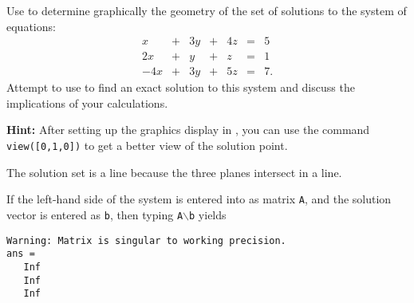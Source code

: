 \documentclass{ximera}
\begin{document}
\begin{computerExercise} \label{c2.2.4}
Use \Matlab to determine graphically the geometry of the set of
solutions to the system of equations:
\[
\begin{array}{rcrcrcr}
  x & + & 3y & + & 4z  & = & 5\\
 2x & + &  y & + &  z  & = & 1\\
-4x & + & 3y & + & 5z  & = & 7.
\end{array}
\]
Attempt to use \Matlab to find an exact solution to this system
and discuss the implications of your calculations.

{\bf Hint:} After setting up the graphics display in \Matlabp,
you can use the command {\tt view([0,1,0])}  to get
a better view of the solution point.

\begin{solution}

\ans The solution set is a line because the three planes intersect in a line.

\soln If the left-hand side of the system is entered into \Matlab as
matrix {\tt A}, and the solution vector is entered as {\tt b}, then
typing {\tt A}$\backslash${\tt b} yields
\begin{verbatim}
Warning: Matrix is singular to working precision.
ans =
   Inf
   Inf
   Inf
\end{verbatim}

\end{solution}
\end{computerExercise}
\end{document}
